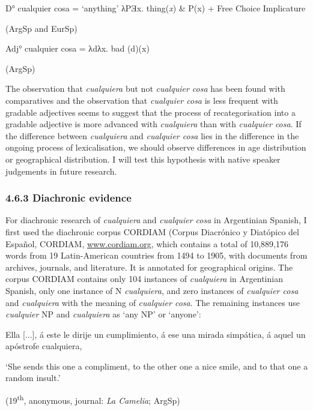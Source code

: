 \documentclass[output=paper]{langscibook}
\begin{document}
\label{bkm:Ref150787837}    D° cualquier cosa = ‘anything’ λPƎx. thing(\textit{x}) \& P(x) + Free Choice Implicature

    (ArgSp and EurSp) 

\label{bkm:Ref150787813}    Adj° cualquier cosa = λdλx. bad (d)(x)

    (ArgSp) 

The observation that \textit{cualquiera} but not \textit{cualquier cosa} has been found with comparatives and the observation that \textit{cualquier cosa} is less frequent with gradable adjectives seems to suggest that the process of recategorisation into a gradable adjective is more advanced with \textit{cualquiera} than with \textit{cualquier cosa}. If the difference between \textit{cualquiera} and \textit{cualquier cosa} lies in the difference in the ongoing process of lexicalisation, we should observe differences in age distribution or geographical distribution. I will test this hypothesis with native speaker judgements in future research. 

\subsubsection{\textbf{4.6.3} \textbf{Diachronic} \textbf{evidence}}

For diachronic research of \textit{cualquiera} and \textit{cualquier cosa} in Argentinian Spanish, I first used the diachronic corpus CORDIAM (Corpus Diacrónico y Diatópico del Español, CORDIAM, \href{http://www.cordiam.org}{www.cordiam.org}, which contains a total of 10,889,176 words from 19 Latin-American countries from 1494 to 1905, with documents from archives, journals, and literature. It is annotated for geographical origins. The corpus CORDIAM contains only 104 instances of \textit{cualquiera} in Argentinian Spanish, only one instance of N \textit{cualquiera}, and zero instances of \textit{cualquier cosa} and \textit{cualquiera} with the meaning of \textit{cualquier cosa}. The remaining instances use \textit{cualquier} NP and \textit{cualquiera} as ‘any NP’ or ‘anyone’: 

    Ella [...], á este le dirije un cumplimiento, á ese una mirada simpática, á aquel un apóstrofe cualquiera,

    ‘She sends this one a compliment, to the other one a nice smile, and to that one a random insult.’

\begin{styleListParagraph}
\textmd{    (19}\textmd{\textsuperscript{th}}\textmd{, anonymous, journal:} \textmd{\textit{La Camelia}}\textmd{; ArgSp)}
\end{styleListParagraph}
\end{document}
